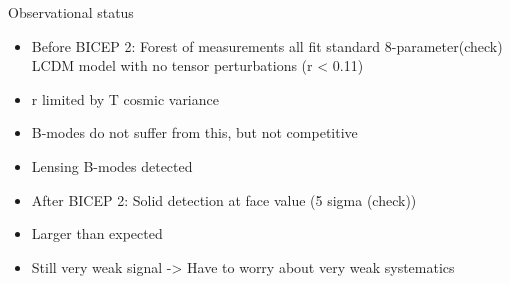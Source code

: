 \documentclass{beamer}
\begin{document}
%

\begin{frame}{Observational status}
	\begin{itemize}
		\item Before BICEP 2: Forest of measurements all fit standard 8-parameter(check)
			LCDM model with no tensor perturbations (r < 0.11)
		\item r limited by T cosmic variance
		\item B-modes do not suffer from this, but not competitive
		\item Lensing B-modes detected
		\item After BICEP 2: Solid detection at face value (5 sigma (check))
		\item Larger than expected
		\item Still very weak signal -> Have to worry about very weak systematics
	\end{itemize}
\end{frame}
\end{document}
